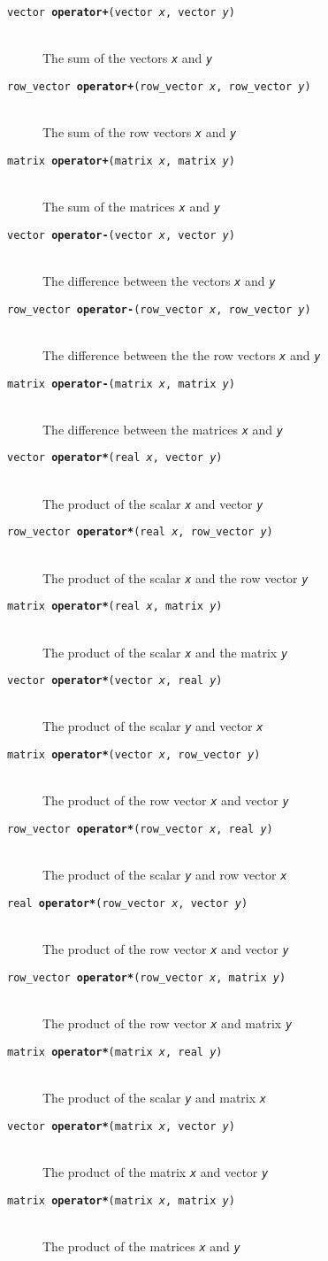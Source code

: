 \documentclass[10pt]{report}
\newcommand{\fitem}[4]{\item[{\tt #1 {\bfseries #2}(#3)}]\mbox{ } \\[4pt] #4}
\newcommand{\farg}[1]{{\tt\slshape #1}}
\begin{document}
\begin{description}
%
\fitem{vector}{operator+}{vector \farg{x}, vector \farg{y}}{The sum of
the vectors \farg{x} and \farg{y}}
%
\fitem{row\_vector}{operator+}{row\_vector \farg{x}, row\_vector \farg{y}}{The sum of
the row vectors \farg{x} and \farg{y}}
%
\fitem{matrix}{operator+}{matrix \farg{x}, matrix \farg{y}}{The sum of
the matrices \farg{x} and \farg{y}}
%
\end{description}
\vspace*{-4pt}
\begin{description}
\fitem{vector}{operator-}{vector \farg{x}, vector \farg{y}}{The difference between
the vectors \farg{x} and \farg{y}}
%
\fitem{row\_vector}{operator-}{row\_vector \farg{x}, row\_vector \farg{y}}{The
  difference between the the row vectors \farg{x} and \farg{y}}
%
\fitem{matrix}{operator-}{matrix \farg{x}, matrix \farg{y}}{The difference between
  the matrices \farg{x} and \farg{y}}
%
\end{description}
\vspace*{-4pt}
\begin{description}
%
\fitem{vector}{operator*}{real \farg{x}, vector \farg{y}}{The product of
the scalar \farg{x} and vector \farg{y}}
%
\fitem{row\_vector}{operator*}{real \farg{x}, row\_vector \farg{y}}{The product of
the scalar \farg{x} and the row vector \farg{y}}
%
\fitem{matrix}{operator*}{real \farg{x}, matrix \farg{y}}{The product of
the scalar \farg{x} and the matrix \farg{y}}
%
%
\fitem{vector}{operator*}{vector \farg{x}, real \farg{y}}{The product of
the scalar \farg{y} and vector \farg{x}}
%
\fitem{matrix}{operator*}{vector \farg{x}, row\_vector \farg{y}}{The product
of the row vector \farg{x} and vector \farg{y}}
%
%
\fitem{row\_vector}{operator*}{row\_vector \farg{x}, real \farg{y}}{The product of
the scalar \farg{y} and row vector \farg{x}}
%
\fitem{real}{operator*}{row\_vector \farg{x}, vector \farg{y}}{The product
of the row vector \farg{x} and vector \farg{y}}
%
\fitem{row\_vector}{operator*}{row\_vector \farg{x}, matrix \farg{y}}{The product
of the row vector \farg{x} and matrix \farg{y}}
%
%
\fitem{matrix}{operator*}{matrix \farg{x}, real \farg{y}}{The product of
the scalar \farg{y} and matrix \farg{x}}
%
\fitem{vector}{operator*}{matrix \farg{x}, vector \farg{y}}{The
  product of the matrix \farg{x} and vector \farg{y}}
%
\fitem{matrix}{operator*}{matrix \farg{x}, matrix \farg{y}}{The product of 
  the matrices \farg{x} and \farg{y}}
%
\end{description}
%
\end{document}
